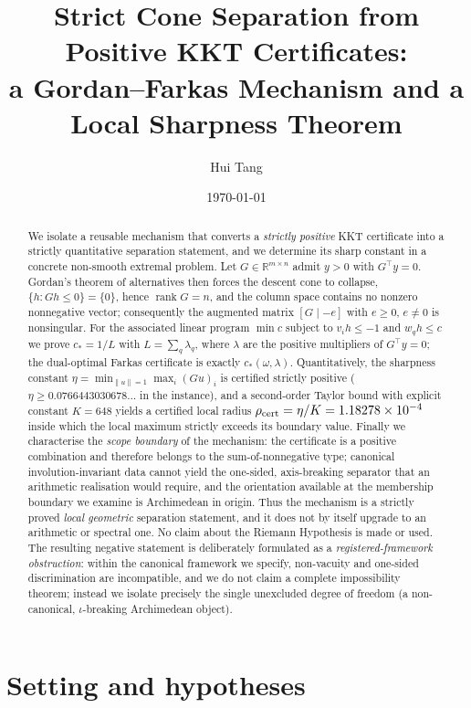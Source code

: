 \documentclass[11pt]{article}
\title{Strict Cone Separation from Positive KKT Certificates:\\ a Gordan--Farkas Mechanism and a Local Sharpness Theorem}
\author{Hui Tang}
\date{\today}
\theoremstyle{definition}
\newcommand{\R}{\mathbb{R}}
\newcommand{\rank}{\operatorname{rank}}
\begin{document}
\maketitle

\begin{abstract}
We isolate a reusable mechanism that converts a \emph{strictly positive} KKT certificate into a
strictly quantitative separation statement, and we determine its sharp constant in a concrete
non-smooth extremal problem. Let $G\in\R^{m\times n}$ admit $y>0$ with $G^{\top}y=0$. Gordan's
theorem of alternatives then forces the descent cone to collapse, $\{h:Gh\le 0\}=\{0\}$, hence
$\rank G=n$, and the column space contains no nonzero nonnegative vector; consequently the augmented
matrix $[G\mid -e]$ with $e\ge 0$, $e\neq0$ is nonsingular. For the associated linear program
$\min c$ subject to $v_ih\le-1$ and $w_qh\le c$ we prove $c_*=1/L$ with $L=\sum_q\lambda_q$, where
$\lambda$ are the positive multipliers of $G^{\top}y=0$; the dual-optimal Farkas certificate is
exactly $c_*(\omega,\lambda)$. Quantitatively, the sharpness constant $\eta=\min_{\|u\|=1}\max_i(Gu)_i$
is certified strictly positive ($\eta\ge 0.0766443030678\ldots$ in the instance), and a second-order
Taylor bound with explicit constant $K=648$ yields a certified local radius
$\rho_{\rm cert}=\eta/K=1.18278\times10^{-4}$ inside which the local maximum strictly exceeds its
boundary value. Finally we characterise the \emph{scope boundary} of the mechanism: the certificate
is a positive combination and therefore belongs to the sum-of-nonnegative type; canonical
involution-invariant data cannot yield the one-sided, axis-breaking separator that an arithmetic
realisation would require, and the orientation available at the membership boundary we examine is
Archimedean in origin. Thus the mechanism is a strictly proved \emph{local geometric} separation
statement, and it does not by itself upgrade to an arithmetic or spectral one. No claim about the
Riemann Hypothesis is made or used.
The resulting negative statement is deliberately formulated as a \emph{registered-framework obstruction}: within the canonical framework we specify, non-vacuity and one-sided discrimination are incompatible, and we do not claim a complete impossibility theorem; instead we isolate precisely the single unexcluded degree of freedom (a non-canonical, $\iota$-breaking Archimedean object). \end{abstract}

\section{Setting and hypotheses}\label{sec:setting}
\end{document}
